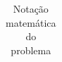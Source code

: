 \begin{table}[H]
\begin{tabular}{p{2cm} p{9.5cm} p{3.2cm}}
	\end{tabular}
	\caption{Notação matemática do problema}
	\label{tab: m1_definicao1}
\end{table}


